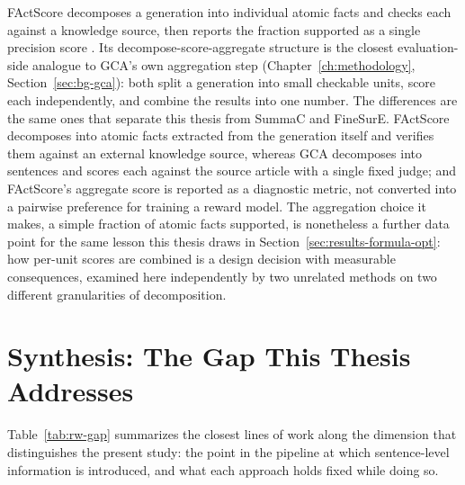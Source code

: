 FActScore decomposes a generation into individual atomic facts and checks
each against a knowledge source, then reports the fraction supported as a
single precision score \citep{min2023factscore}. Its decompose-score-aggregate
structure is the closest evaluation-side analogue to GCA's own aggregation
step (Chapter~\ref{ch:methodology}, Section~\ref{sec:bg-gca}): both split a
generation into small checkable units, score each independently, and combine
the results into one number. The differences are the same ones that
separate this thesis from SummaC and FineSurE. FActScore decomposes into
atomic facts extracted from the generation itself and verifies them against
an external knowledge source, whereas GCA decomposes into sentences and
scores each against the source article with a single fixed judge; and
FActScore's aggregate score is reported as a diagnostic metric, not
converted into a pairwise preference for training a reward model. The
aggregation choice it makes, a simple fraction of atomic facts supported,
is nonetheless a further data point for the same lesson this thesis draws
in Section~\ref{sec:results-formula-opt}: how per-unit scores are combined
is a design decision with measurable consequences, examined here independently
by two unrelated methods on two different granularities of decomposition.

\section{Synthesis: The Gap This Thesis Addresses}
\label{sec:rw-synthesis}

Table~\ref{tab:rw-gap} summarizes the closest lines of work along the dimension
that distinguishes the present study: the point in the pipeline at which
sentence-level information is introduced, and what each approach holds fixed while
doing so.

